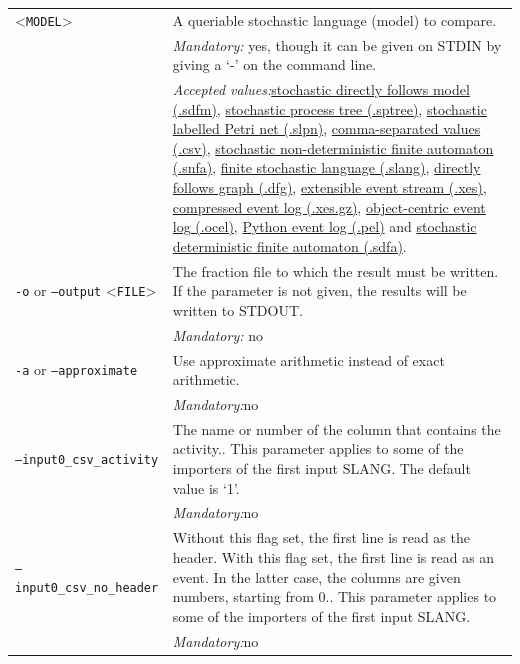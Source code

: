 {\begin{tabularx}{\linewidth}{lX}
<\texttt{MODEL}>&A queriable stochastic language (model) to compare.\\
&\textit{Mandatory:} \quad yes, though it can be given on STDIN by giving a `-' on the command line.\\
&\textit{Accepted values:}\quad \hyperref[filehandler:stochastic directly follows model]{stochastic directly follows model (.sdfm)}, \hyperref[filehandler:stochastic process tree]{stochastic process tree (.sptree)}, \hyperref[filehandler:stochastic labelled Petri net]{stochastic labelled Petri net (.slpn)}, \hyperref[filehandler:comma-separated values]{comma-separated values (.csv)}, \hyperref[filehandler:stochastic non-deterministic finite automaton]{stochastic non-deterministic finite automaton (.snfa)}, \hyperref[filehandler:finite stochastic language]{finite stochastic language (.slang)}, \hyperref[filehandler:directly follows graph]{directly follows graph (.dfg)}, \hyperref[filehandler:extensible event stream]{extensible event stream (.xes)}, \hyperref[filehandler:compressed event log]{compressed event log (.xes.gz)}, \hyperref[filehandler:object-centric event log]{object-centric event log (.ocel)}, \hyperref[filehandler:Python event log]{Python event log (.pel)} and \hyperref[filehandler:stochastic deterministic finite automaton]{stochastic deterministic finite automaton (.sdfa)}.\\
\texttt{-o} or \texttt{--output} <\texttt{FILE}> &
The fraction file to which the result must be written. If the parameter is not given, the results will be written to STDOUT.\\
&\textit{Mandatory:} \quad no\\
\texttt{-a} or \texttt{--approximate} & Use approximate arithmetic instead of exact arithmetic.\\
&\textit{Mandatory:}\quad no\\
\texttt{--input0\_csv\_activity} & The name or number of the column that contains the activity.. This parameter applies to some of the importers of the first input SLANG. The default value is `1'.\\
&\textit{Mandatory:}\quad no\\
\texttt{--input0\_csv\_no\_header} & Without this flag set, the first line is read as the header. 
    With this flag set, the first line is read as an event. In the latter case, the columns are given numbers, starting from 0.. This parameter applies to some of the importers of the first input SLANG. \\
&\textit{Mandatory:}\quad no\\

\end{tabularx}}
